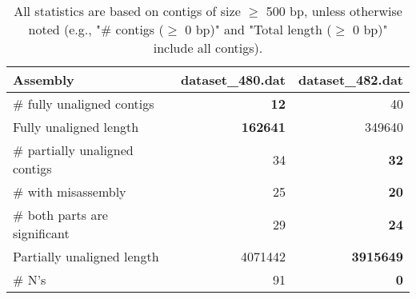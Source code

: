 \documentclass[12pt,a4paper]{article}
\begin{document}
\begin{table}[ht]
\begin{center}
\caption{All statistics are based on contigs of size $\geq$ 500 bp, unless otherwise noted (e.g., "\# contigs ($\geq$ 0 bp)" and "Total length ($\geq$ 0 bp)" include all contigs).}
\begin{tabular}{|l*{2}{|r}|}
\hline
Assembly & dataset\_480.dat & dataset\_482.dat \\ \hline
\# fully unaligned contigs & {\bf 12} & 40 \\ \hline
Fully unaligned length & {\bf 162641} & 349640 \\ \hline
\# partially unaligned contigs & 34 & {\bf 32} \\ \hline
\hspace{5mm}\# with misassembly & 25 & {\bf 20} \\ \hline
\hspace{5mm}\# both parts are significant & 29 & {\bf 24} \\ \hline
Partially unaligned length & 4071442 & {\bf 3915649} \\ \hline
\# N's & 91 & {\bf 0} \\ \hline
\end{tabular}
\end{center}
\end{table}
\end{document}
